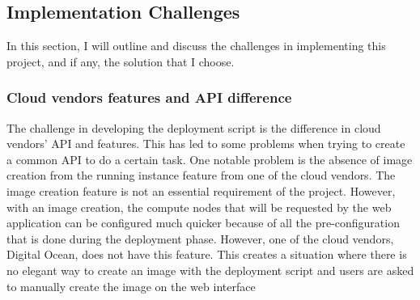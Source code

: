 \subsection{Implementation Challenges}


In this section, I will outline and discuss the challenges in implementing this project, and if any, the solution that I choose.

\subsubsection{Cloud vendors features and API difference}

The challenge in developing the deployment script is the difference in cloud vendors' API and features.  This has led to some problems when trying to create a common API to do a certain task. One notable problem is the absence of image creation from the running instance feature from one of the cloud vendors. The image creation feature is not an essential requirement of the project. However, with an image creation, the compute nodes that will be requested by the web application can be configured much quicker because of all the pre-configuration that is done during the deployment phase. However, one of the cloud vendors, Digital Ocean, does not have this feature. This creates a situation where there is no elegant way to create an image with the deployment script and users are asked to manually create the image on the web interface

\vspace{1cm}

\noindent%
\begin{minipage}{\linewidth}%
\label{fig:hemeweb-challenge-1}%
\end{minipage}

